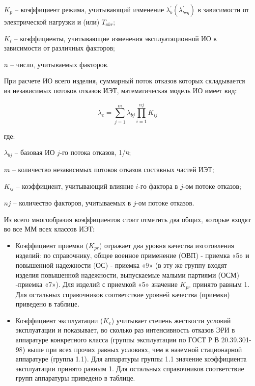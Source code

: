 \documentclass[a4paper,14pt]{article}
\begin{document}
$K_p$ -- коэффициент режима, учитывающий изменение $\lambda_b^{'}(\lambda_{bcg}^{'})$ в зависимости от электрической нагрузки и (или)  $T_{okr}$; 

$K_i$ -- коэффициенты, учитывающие изменения эксплуатационной ИО в зависимости от различных факторов; 

$n$ -- число, учитываемых факторов.

При расчете ИО всего изделия, суммарный поток отказов которых складывается из независимых потоков отказов ИЭТ, математическая модель ИО имеет вид:


\begin{equation}
	\lambda_{e} = \sum_{j=1}^{m} \lambda_{bj} \prod_{i=1}^{nj} K_{ij}
\end{equation}

где:

$\lambda_{bj}$ -- базовая ИО $j$-го потока отказов, 1/ч; 

$m$ -- количество независимых потоков отказов составных частей ИЭТ; 

$K_{ij}$ -- коэффициент, учитывающий влияние $i$-го фактора в $j$-ом потоке отказов; 

$nj$ -- количество факторов, учитываемых в $j$-ом потоке отказов.

Из всего многообразия коэффициентов стоит отметить два общих, которые входят во все ММ всех классов ИЭТ:

\begin{itemize}
	\item Коэффициент приемки ($K_{pr}$) отражает два уровня качества изготовления изделий: по справочнику, общее военное применение (ОВП) - приемка «5» и повышенной надежности (ОС) - приемка «9» (в эту же группу входят изделия повышенной надежности, выпускаемые малыми партиями (ОСМ) -приемка «7»).
	Для изделий с приемкой «5» значение $K_{pr}$ принято равным 1.
	Для остальных справочников соответствие уровней качества (приемки) приведено в таблице.
	
	\item Коэффициент эксплуатации ($K_{e}$) учитывает степень жесткости условий эксплуатации и показывает, во сколько раз интенсивность отказов ЭРИ в аппаратуре конкретного класса (группы эксплуатации по ГОСТ Р В 20.39.301-98) выше при всех прочих равных условиях, чем в наземной стационарной аппаратуре (группа 1.1).
	Для аппаратуры группы 1.1 значение коэффициента эксплуатации принято равным 1.
	Для остальных справочников соответствие групп аппаратуры приведено в таблице.
\end{itemize}
\end{document}
